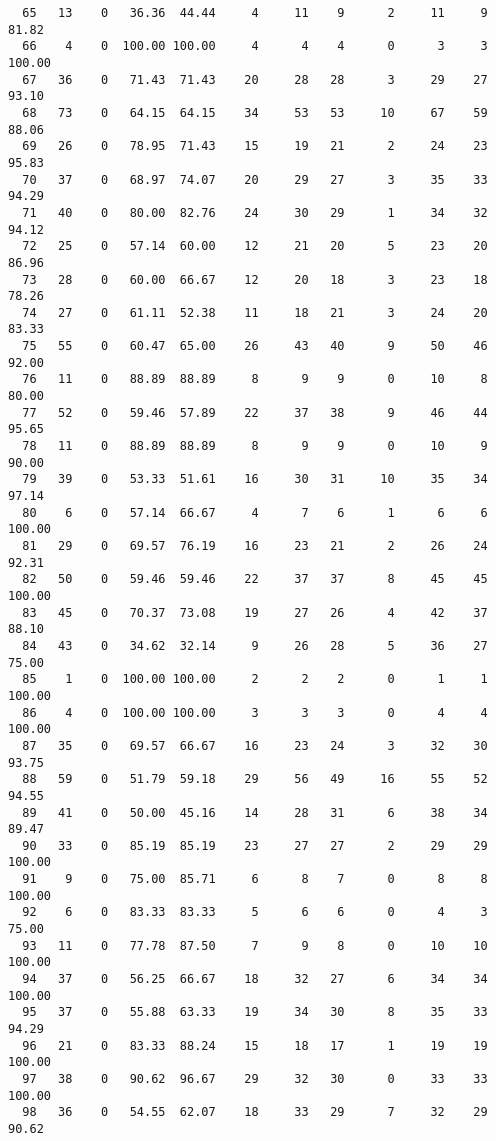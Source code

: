 \begin{verbatim}
  65   13    0   36.36  44.44     4     11    9      2     11     9    81.82
  66    4    0  100.00 100.00     4      4    4      0      3     3   100.00
  67   36    0   71.43  71.43    20     28   28      3     29    27    93.10
  68   73    0   64.15  64.15    34     53   53     10     67    59    88.06
  69   26    0   78.95  71.43    15     19   21      2     24    23    95.83
  70   37    0   68.97  74.07    20     29   27      3     35    33    94.29
  71   40    0   80.00  82.76    24     30   29      1     34    32    94.12
  72   25    0   57.14  60.00    12     21   20      5     23    20    86.96
  73   28    0   60.00  66.67    12     20   18      3     23    18    78.26
  74   27    0   61.11  52.38    11     18   21      3     24    20    83.33
  75   55    0   60.47  65.00    26     43   40      9     50    46    92.00
  76   11    0   88.89  88.89     8      9    9      0     10     8    80.00
  77   52    0   59.46  57.89    22     37   38      9     46    44    95.65
  78   11    0   88.89  88.89     8      9    9      0     10     9    90.00
  79   39    0   53.33  51.61    16     30   31     10     35    34    97.14
  80    6    0   57.14  66.67     4      7    6      1      6     6   100.00
  81   29    0   69.57  76.19    16     23   21      2     26    24    92.31
  82   50    0   59.46  59.46    22     37   37      8     45    45   100.00
  83   45    0   70.37  73.08    19     27   26      4     42    37    88.10
  84   43    0   34.62  32.14     9     26   28      5     36    27    75.00
  85    1    0  100.00 100.00     2      2    2      0      1     1   100.00
  86    4    0  100.00 100.00     3      3    3      0      4     4   100.00
  87   35    0   69.57  66.67    16     23   24      3     32    30    93.75
  88   59    0   51.79  59.18    29     56   49     16     55    52    94.55
  89   41    0   50.00  45.16    14     28   31      6     38    34    89.47
  90   33    0   85.19  85.19    23     27   27      2     29    29   100.00
  91    9    0   75.00  85.71     6      8    7      0      8     8   100.00
  92    6    0   83.33  83.33     5      6    6      0      4     3    75.00
  93   11    0   77.78  87.50     7      9    8      0     10    10   100.00
  94   37    0   56.25  66.67    18     32   27      6     34    34   100.00
  95   37    0   55.88  63.33    19     34   30      8     35    33    94.29
  96   21    0   83.33  88.24    15     18   17      1     19    19   100.00
  97   38    0   90.62  96.67    29     32   30      0     33    33   100.00
  98   36    0   54.55  62.07    18     33   29      7     32    29    90.62

\end{verbatim}
